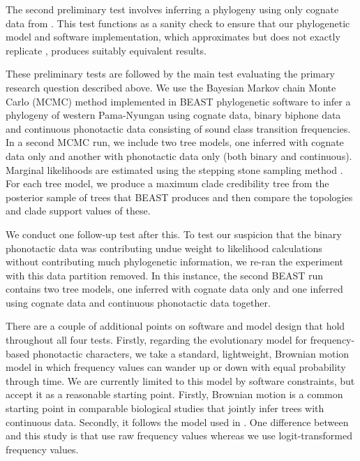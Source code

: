 The second preliminary test involves inferring a phylogeny using only cognate data from \textcite{bouckaert_origin_2018}. This test functions as a sanity check to ensure that our phylogenetic model and software implementation, which approximates but does not exactly replicate \textcite{bouckaert_origin_2018}, produces suitably equivalent results.

These preliminary tests are followed by the main test evaluating the primary research question described above. We use the Bayesian Markov chain Monte Carlo (MCMC) method implemented in BEAST phylogenetic software to infer a phylogeny of western Pama-Nyungan using cognate data, binary biphone data and continuous phonotactic data consisting of sound class transition frequencies. In a second MCMC run, we include two tree models, one inferred with cognate data only and another with phonotactic data only (both binary and continuous). Marginal likelihoods are estimated using the stepping stone sampling method \autocite{baele_accurate_2013}. For each tree model, we produce a maximum clade credibility tree from the posterior sample of trees that BEAST produces and then compare the topologies and clade support values of these.

We conduct one follow-up test after this. To test our suspicion that the binary phonotactic data was contributing undue weight to likelihood calculations without contributing much phylogenetic information, we re-ran the experiment with this data partition removed. In this instance, the second BEAST run contains two tree models, one inferred with cognate data only and one inferred using cognate data and continuous phonotactic data together.

There are a couple of additional points on software and model design that hold throughout all four tests. Firstly, regarding the evolutionary model for frequency-based phonotactic characters, we take a standard, lightweight, Brownian motion model in which frequency values can wander up or down with equal probability through time. We are currently limited to this model by software constraints, but accept it as a reasonable starting point. Firstly, Brownian motion is a common starting point in comparable biological studies that jointly infer trees with continuous data. Secondly, it follows the model used in \textcite{macklin-cordes_phylogenetic_2020}. One difference between \textcite{macklin-cordes_phylogenetic_2020} and this study is that \textcite{macklin-cordes_phylogenetic_2020} use raw frequency values whereas we use logit-transformed frequency values.

